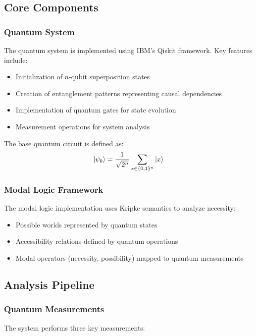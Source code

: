 \subsection{Core Components}

\subsubsection{Quantum System}
The quantum system is implemented using IBM's Qiskit framework. Key features include:

\begin{itemize}
    \item Initialization of $n$-qubit superposition states
    \item Creation of entanglement patterns representing causal dependencies
    \item Implementation of quantum gates for state evolution
    \item Measurement operations for system analysis
\end{itemize}

The base quantum circuit is defined as:
\begin{equation}
    \ket{\psi_0} = \frac{1}{\sqrt{2^n}}\sum_{x\in\{0,1\}^n}\ket{x}
\end{equation}

\subsubsection{Modal Logic Framework}
The modal logic implementation uses Kripke semantics to analyze necessity:

\begin{itemize}
    \item Possible worlds represented by quantum states
    \item Accessibility relations defined by quantum operations
    \item Modal operators (necessity, possibility) mapped to quantum measurements
\end{itemize}

\subsection{Analysis Pipeline}

\subsubsection{Quantum Measurements}
The system performs three key measurements:

